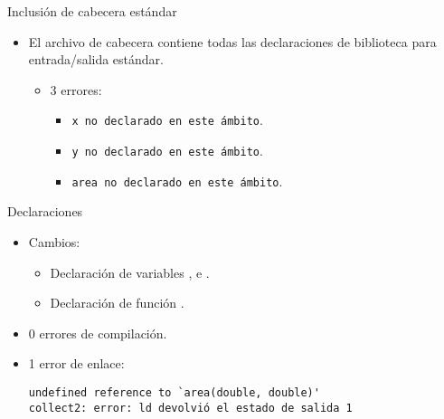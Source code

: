\begin{frame}[fragile]{Inclusión de cabecera estándar}

\begin{itemize}
  \item El archivo de cabecera  contiene todas las declaraciones
        de biblioteca para entrada/salida estándar.
    \begin{itemize}
      \item 3 errores:
        \begin{itemize}
          \item \verb+x no declarado en este ámbito+.
          \item \verb+y no declarado en este ámbito+.
          \item \verb+area no declarado en este ámbito+.
        \end{itemize}
    \end{itemize}
\end{itemize}
\end{frame}

\begin{frame}[fragile]{Declaraciones}

\begin{itemize}
  \item Cambios:
    \begin{itemize}
      \item Declaración de variables , e .
      \item Declaración de función .
    \end{itemize}
  \item 0 errores de compilación.
  \item 1 error de enlace:
\begin{lstlisting}[style=terminal]
undefined reference to `area(double, double)'
collect2: error: ld devolvió el estado de salida 1
\end{lstlisting}
\end{itemize}
\end{frame}
